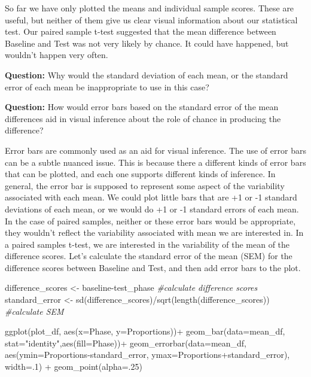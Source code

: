 \documentclass[
]{book}
\newenvironment{Shaded}{\begin{snugshade}}{\end{snugshade}}
\newcommand{\AttributeTok}[1]{\textcolor[rgb]{0.77,0.63,0.00}{#1}}
\newcommand{\CommentTok}[1]{\textcolor[rgb]{0.56,0.35,0.01}{\textit{#1}}}
\newcommand{\DecValTok}[1]{\textcolor[rgb]{0.00,0.00,0.81}{#1}}
\newcommand{\FunctionTok}[1]{\textcolor[rgb]{0.00,0.00,0.00}{#1}}
\newcommand{\NormalTok}[1]{#1}
\newcommand{\OtherTok}[1]{\textcolor[rgb]{0.56,0.35,0.01}{#1}}
\newcommand{\SpecialCharTok}[1]{\textcolor[rgb]{0.00,0.00,0.00}{#1}}
\newcommand{\StringTok}[1]{\textcolor[rgb]{0.31,0.60,0.02}{#1}}
\begin{document}
So far we have only plotted the means and individual sample scores. These are useful, but neither of them give us clear visual information about our statistical test. Our paired sample t-test suggested that the mean difference between Baseline and Test was not very likely by chance. It could have happened, but wouldn't happen very often.

\textbf{Question:} Why would the standard deviation of each mean, or the standard error of each mean be inappropriate to use in this case?

\textbf{Question:} How would error bars based on the standard error of the mean differences aid in visual inference about the role of chance in producing the difference?

Error bars are commonly used as an aid for visual inference. The use of error bars can be a subtle nuanced issue. This is because there a different kinds of error bars that can be plotted, and each one supports different kinds of inference. In general, the error bar is supposed to represent some aspect of the variability associated with each mean. We could plot little bars that are +1 or -1 standard deviations of each mean, or we would do +1 or -1 standard errors of each mean. In the case of paired samples, neither or these error bars would be appropriate, they wouldn't reflect the variability associated with mean we are interested in. In a paired samples t-test, we are interested in the variability of the mean of the difference scores. Let's calculate the standard error of the mean (SEM) for the difference scores between Baseline and Test, and then add error bars to the plot.

\begin{Shaded}
\begin{Highlighting}[]
\NormalTok{difference\_scores }\OtherTok{\textless{}{-}}\NormalTok{ baseline}\SpecialCharTok{{-}}\NormalTok{test\_phase }\CommentTok{\#calculate difference scores}
\NormalTok{standard\_error }\OtherTok{\textless{}{-}} \FunctionTok{sd}\NormalTok{(difference\_scores)}\SpecialCharTok{/}\FunctionTok{sqrt}\NormalTok{(}\FunctionTok{length}\NormalTok{(difference\_scores)) }\CommentTok{\#calculate SEM}


\FunctionTok{ggplot}\NormalTok{(plot\_df, }\FunctionTok{aes}\NormalTok{(}\AttributeTok{x=}\NormalTok{Phase, }\AttributeTok{y=}\NormalTok{Proportions))}\SpecialCharTok{+} 
  \FunctionTok{geom\_bar}\NormalTok{(}\AttributeTok{data=}\NormalTok{mean\_df, }\AttributeTok{stat=}\StringTok{"identity"}\NormalTok{,}\FunctionTok{aes}\NormalTok{(}\AttributeTok{fill=}\NormalTok{Phase))}\SpecialCharTok{+}
  \FunctionTok{geom\_errorbar}\NormalTok{(}\AttributeTok{data=}\NormalTok{mean\_df, }\FunctionTok{aes}\NormalTok{(}\AttributeTok{ymin=}\NormalTok{Proportions}\SpecialCharTok{{-}}\NormalTok{standard\_error, }
                                  \AttributeTok{ymax=}\NormalTok{Proportions}\SpecialCharTok{+}\NormalTok{standard\_error), }\AttributeTok{width=}\NormalTok{.}\DecValTok{1}\NormalTok{) }\SpecialCharTok{+}
  \FunctionTok{geom\_point}\NormalTok{(}\AttributeTok{alpha=}\NormalTok{.}\DecValTok{25}\NormalTok{)}
\end{Highlighting}
\end{Shaded}
\end{document}
